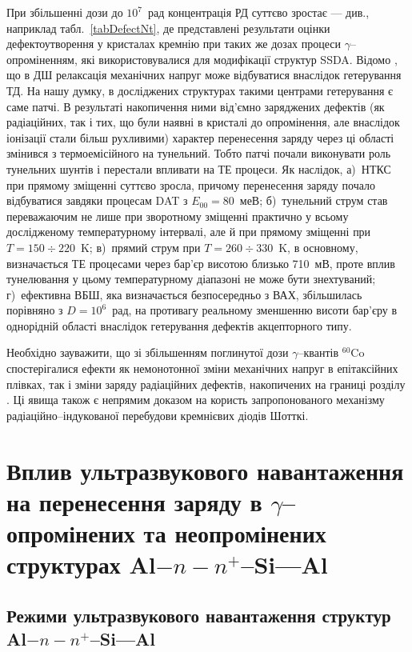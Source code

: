 При збільшенні дози до $10^7$~рад концентрація РД суттєво зростає --- див., наприклад табл.~\ref{tabDefectNt}, де представлені результати оцінки дефектоутворення
у кристалах кремнію при таких же дозах процеси $\gamma$--опроміненням, які використовувалися для модифікації
структур SSDA.
Відомо \cite{Boltovets}, що в ДШ релаксація механічних напруг може відбуватися внаслідок гетерування ТД.
На нашу думку, в досліджених структурах такими центрами гетерування є саме патчі.
В результаті накопичення ними від'ємно заряджених дефектів (як радіаційних, так і тих, що були наявні в кристалі до опромінення, але внаслідок іонізації
стали більш рухливими) характер перенесення заряду через ці області змінився з термоемісійного на тунельний.
Тобто патчі почали виконувати роль тунельних шунтів і перестали впливати на ТЕ процеси.
Як наслідок,
а)~НТКС при прямому зміщенні суттєво зросла, причому перенесення заряду почало відбуватися завдяки процесам DAT з $E_{00}=80$~меВ;
б)~тунельний струм став переважаючим не лише при зворотному зміщенні практично у всьому дослідженому температурному інтервалі,
але й при прямому зміщенні при $T=150\div220$~K;
в)~прямий струм при $T=260\div330$~K, в основному, визначається ТЕ процесами через бар'єр висотою близько 710~мВ,
проте вплив тунелювання у цьому температурному діапазоні не може бути знехтуваний;
г)~ефективна ВБШ, яка визначається безпосередньо з ВАХ, збільшилась порівняно з  $D=10^6$~рад, на противагу реальному зменшенню висоти бар'єру в однорідній області внаслідок гетерування дефектів акцепторного типу.

Необхідно зауважити, що зі збільшенням поглинутої дози $\gamma$--квантів $^{60}$Co спостерігалися ефекти як немонотонної зміни механічних напруг
в епітаксійних плівках, так і зміни заряду радіаційних дефектів, накопичених на границі розділу \cite{Muzafarova, Belyaev}.
Ці явища також є непрямим доказом на користь запропонованого механізму радіаційно--індукованої перебудови кремнієвих діодів Шотткі.



\section{Вплив ультразвукового навантаження на перенесення заряду в $\gamma$--опромінених та неопромінених структурах Al$-n-n^+$--Si---Al\label{MSSi_USL}}

\subsection{Режими ультразвукового навантаження структур Al$-n-n^+$--Si---Al}

